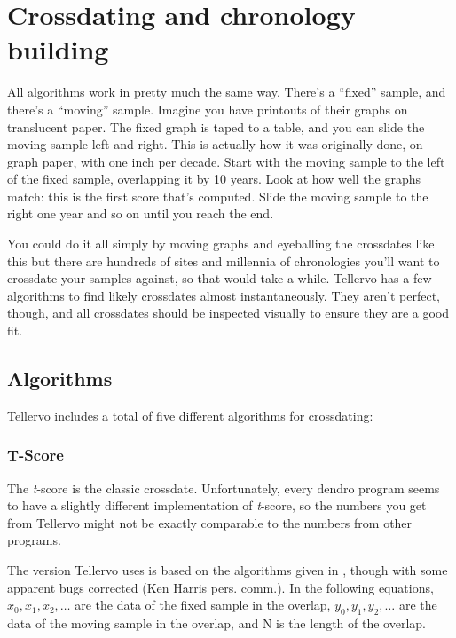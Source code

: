 \chapter{Crossdating and chronology building}
\label{txt:crossdating}

All algorithms work in pretty much the same way. There's a ``fixed'' sample, and there's a ``moving'' sample. Imagine you have printouts of their graphs on translucent paper. The fixed graph is taped to a table, and you can slide the moving sample left and right. This is actually how it was originally done, on graph paper, with one inch per decade. Start with the moving sample to the left of the fixed sample, overlapping it by 10 years. Look at how well the graphs match: this is the first score that's computed. Slide the moving sample to the right one year and so on until you reach the end.

You could do it all simply by moving graphs and eyeballing the crossdates like this but there are hundreds of sites and millennia of chronologies you'll want to crossdate your samples against, so that would take a while. Tellervo has a few algorithms to find likely crossdates almost instantaneously. They aren't perfect, though, and all crossdates should be inspected visually to ensure they are a good fit. 

\section{Algorithms}
Tellervo includes a total of five different algorithms for crossdating:


\subsection{T-Score}
The \textit{t}-score is the classic crossdate. Unfortunately, every dendro program seems to have a slightly different implementation of \textit{t}-score, so the numbers you get from Tellervo might not be exactly comparable to the numbers from other programs. 

The version Tellervo uses is based on the algorithms given in \citet{Baillie73}, though with some apparent bugs corrected (Ken Harris pers. comm.). In the following equations, $x_{0}, x_{1}, x_{2}, \dots$ are the data of the fixed sample in the overlap, $y_{0}, y_{1}, y_{2}, \dots$ are the data of the moving sample in the overlap, and N is the length of the overlap.

